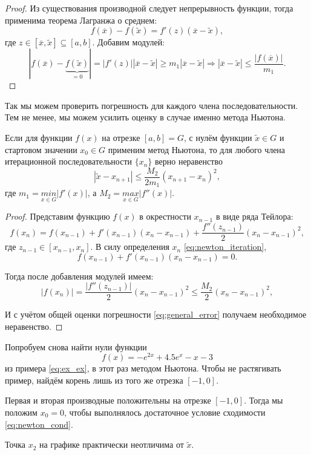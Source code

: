 \documentclass[../main.tex]{subfile}
\begin{document}
\begin{proof}
	Из существования производной следует непрерывность функции, тогда
	применима теорема Лагранжа о среднем:
	\[f(\overline{x})-f(\widetilde{x})=f'(z)(\overline{x}-\widetilde{x}),\]
	где $z\in[\overline{x},\widetilde{x}]\subseteq[a,b]$. Добавим модулей:
	\[|f(\overline{x})-\underset{=0}{\underbrace{f(\widetilde{x})}}|=|f'(z)|
		|\overline{x}-\widetilde{x}|\ge m_1|\overline{x}-\widetilde{x}|
		\Rightarrow |\overline{x}-\widetilde{x}|\le
		\frac{|f(\overline{x})|}{m_1}.\]
\end{proof}

Так мы можем проверить погрешность для каждого члена последовательности. Тем не
менее, мы можем усилить оценку в случае именно метода Ньютона.

\begin{theorem}
\label{eq:newton_method_error}
	Если для функции $f(x)$ на отрезке $[a,b]=G$, с нулём функции
	$\widetilde{x}\in G$ и стартовом значении $x_0\in G$ применим метод
	Ньютона, то для любого члена итерационной последовательности $\{x_n\}$
	верно неравенство
	\[\boxed{|\widetilde{x}-x_{n+1}|\le \frac{M_2}{2m_1}
	(x_{n+1}-x_n)^2},\]
	где $m_1=\underset{x\in G}{min}|f'(x)|$, а $M_2=\underset{x\in G}{max}
	|f''(x)|$.
\end{theorem}

\begin{proof}
	Представим функцию $f(x)$ в окрестности $x_{n-1}$ в виде ряда Тейлора:
	\[f(x_n)=f(x_{n-1})+f'(x_{n-1})(x_n-x_{n-1})+\frac{f''(z_{n-1})}{2}
	(x_n-x_{n-1})^2,\]
	где $z_{n-1}\in[x_{n-1},x_n]$. В силу определения $x_n$
	\eqref{eq:newton_iteration},
	\[f(x_{n-1})+f'(x_{n-1})(x_n-x_{n-1})=0.\]

	Тогда после добавления модулей имеем:
	\[|f(x_n)|=\frac{|f''(z_{n-1})|}{2}(x_n-x_{n-1})^2\le \frac{M_2}{2}
	(x_n-x_{n-1})^2,\]

	И с учётом общей оценки погрешности \eqref{eq:general_error} получаем
	необходимое неравенство.
\end{proof}

\begin{example}
	Попробуем снова найти нули функции
	\[f(x)=-e^{2x}+4.5e^x-x-3\]
	из примера \eqref{eq:ex_ex}, в этот раз методом Ньютона. Чтобы не
	растягивать пример, найдём корень лишь из того же отрезка $[-1,0]$.

	Первая и вторая производные положительны на отрезке $[-1,0]$. Тогда
	мы положим $x_0=0$, чтобы выполнялось достаточное условие сходимости
	\eqref{eq:newton_cond}.
	\newline

	

	Точка $x_2$ на графике практически неотличима от $\widetilde{x}$.
\end{example}
\end{document}
